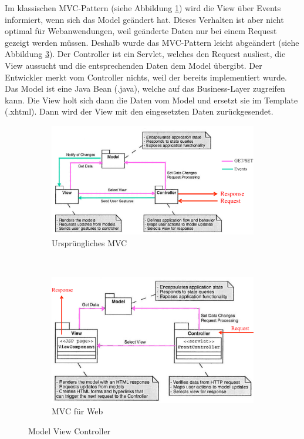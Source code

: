 Im klassischen MVC-Pattern (siehe Abbildung \ref{fig:mvc1}) wird die View über Events informiert, wenn sich das Model geändert hat. Dieses Verhalten ist aber nicht optimal für Webanwendungen, weil geänderte Daten nur bei einem Request gezeigt werden müssen. Deshalb wurde das MVC-Pattern leicht abgeändert (siehe Abbildung \ref{fig:mvc2}). Der Controller ist ein Servlet, welches den Request ausliest, die View aussucht und die entsprechenden Daten dem Model übergibt. Der Entwickler merkt vom Controller nichts, weil der bereits implementiert wurde. Das Model ist eine Java Bean (.java), welche auf das Business-Layer zugreifen kann. Die View holt sich dann die Daten vom Model und ersetzt sie im Template (.xhtml). Dann wird der View mit den eingesetzten Daten zurückgesendet.

\begin{figure}
	\centering
	\begin{subfigure}[b]{0.5\textwidth}
		\includegraphics[width=\textwidth]{fig/mvc1}
		\caption{Ursprüngliches MVC}
		\label{fig:mvc1}
	\end{subfigure}
	~
	\begin{subfigure}[b]{0.4\textwidth}
		\includegraphics[width=\textwidth]{fig/mvc2}
		\caption{MVC für Web}
		\label{fig:mvc2}
	\end{subfigure}
	\caption{Model View Controller}
\end{figure}

